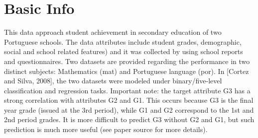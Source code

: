 \documentclass{article}
\begin{document}
\section{Basic Info}
This data approach student achievement in secondary education of two Portuguese schools. The data attributes include student grades, demographic, social and school related features) and it was collected by using school reports and questionnaires. Two datasets are provided regarding the performance in two distinct subjects: Mathematics (mat) and Portuguese language (por). In [Cortez and Silva, 2008], the two datasets were modeled under binary/five-level classification and regression tasks. Important note: the target attribute G3 has a strong correlation with attributes G2 and G1. This occurs because G3 is the final year grade (issued at the 3rd period), while G1 and G2 correspond to the 1st and 2nd period grades. It is more difficult to predict G3 without G2 and G1, but such prediction is much more useful (see paper source for more details).
\end{document}
